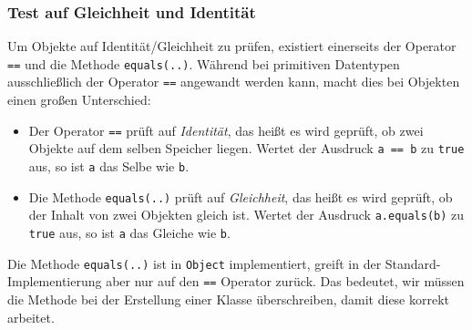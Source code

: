 	\subsubsection{Test auf Gleichheit und Identität}
		\label{sec:equals_identity}
	
		Um Objekte auf Identität/Gleichheit zu prüfen, existiert einerseits der Operator \lstinline|==| und die Methode \lstinline|equals(..)|. Während bei primitiven Datentypen ausschließlich der Operator \lstinline|==| angewandt werden kann, macht dies bei Objekten einen großen Unterschied:
		\begin{itemize}
			\item Der Operator \lstinline|==| prüft auf \textit{Identität}, das heißt es wird geprüft, ob zwei Objekte auf dem selben Speicher liegen. Wertet der Ausdruck \lstinline|a == b| zu \lstinline|true| aus, so ist \lstinline|a| das Selbe wie \lstinline|b|.
			\item Die Methode \lstinline|equals(..)| prüft auf \textit{Gleichheit}, das heißt es wird geprüft, ob der Inhalt von zwei Objekten gleich ist. Wertet der Ausdruck \lstinline|a.equals(b)| zu \lstinline|true| aus, so ist \lstinline|a| das Gleiche wie \lstinline|b|.
		\end{itemize}
	
		
		Die Methode \lstinline|equals(..)| ist in \lstinline|Object| implementiert, greift in der Standard-Implementierung aber nur auf den \lstinline|==| Operator zurück. Das bedeutet, wir müssen die Methode bei der Erstellung einer Klasse überschreiben, damit diese korrekt arbeitet.
		
		
